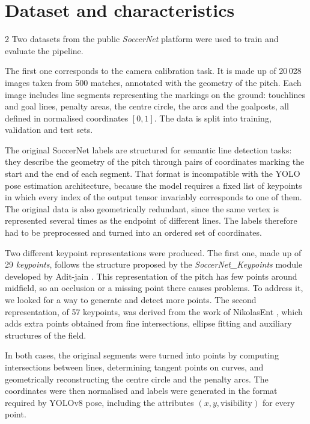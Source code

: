 \section{Dataset and characteristics} \label{sec: data}
\begin{multicols}{2}
Two datasets from the public \emph{SoccerNet} platform were used to train and evaluate the pipeline.

The first one corresponds to the camera calibration task. It is made up of 20\,028 images taken from 500 matches, annotated with the geometry of the pitch.
Each image includes line segments representing the markings on the ground: touchlines and goal lines, penalty areas, the centre circle, the arcs and the goalposts, all defined in normalised coordinates \([0,1]\). The data is split into training, validation and test sets.

The original SoccerNet labels are structured for semantic line detection tasks: they describe the geometry of the pitch through pairs of coordinates marking the start and the end of each segment. That format is incompatible with the YOLO pose estimation architecture, because the model requires a fixed list of keypoints in which every index of the output tensor invariably corresponds to one of them. The original data is also geometrically redundant, since the same vertex is represented several times as the endpoint of different lines. The labels therefore had to be preprocessed and turned into an ordered set of coordinates.

Two different keypoint representations were produced. The first one, made up of 29 \emph{keypoints}, follows the structure proposed by the \emph{SoccerNet\_Keypoints} module developed by Adit-jain \cite{soccernet27}. This representation of the pitch has few points around midfield, so an occlusion or a missing point there causes problems. To address it, we looked for a way to generate and detect more points. The second representation, of 57 keypoints, was derived from the work of NikolasEnt \cite{soccernet57}, which adds extra points obtained from fine intersections, ellipse fitting and auxiliary structures of the field.

In both cases, the original segments were turned into points by computing intersections between lines, determining tangent points on curves, and geometrically reconstructing the centre circle and the penalty arcs. The coordinates were then normalised and labels were generated in the format required by YOLOv8 pose, including the attributes $(x, y, \text{visibility})$ for every point.


\end{multicols}
